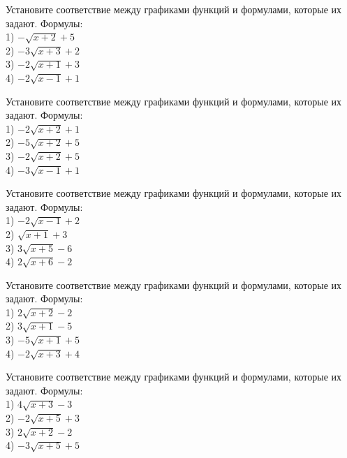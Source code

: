\documentclass[4apaper]{article}
\begin{document}
\begin{taskBN}{91}
Установите соответствие между графиками функций и формулами, которые их задают. Формулы: \\1) $-\sqrt{x+2}+5$\\2) $-3\sqrt{x+3}+2$\\3) $-2\sqrt{x+1}+3$\\4) $-2\sqrt{x-1}+1$
\end{taskBN}

\begin{taskBN}{92}
Установите соответствие между графиками функций и формулами, которые их задают. Формулы: \\1) $-2\sqrt{x+2}+1$\\2) $-5\sqrt{x+2}+5$\\3) $-2\sqrt{x+2}+5$\\4) $-3\sqrt{x-1}+1$
\end{taskBN}

\begin{taskBN}{93}
Установите соответствие между графиками функций и формулами, которые их задают. Формулы: \\1) $-2\sqrt{x-1}+2$\\2) $\sqrt{x+1}+3$\\3) $3\sqrt{x+5}-6$\\4) $2\sqrt{x+6}-2$
\end{taskBN}

\begin{taskBN}{94}
Установите соответствие между графиками функций и формулами, которые их задают. Формулы: \\1) $2\sqrt{x+2}-2$\\2) $3\sqrt{x+1}-5$\\3) $-5\sqrt{x+1}+5$\\4) $-2\sqrt{x+3}+4$
\end{taskBN}

\begin{taskBN}{95}
Установите соответствие между графиками функций и формулами, которые их задают. Формулы: \\1) $4\sqrt{x+3}-3$\\2) $-2\sqrt{x+5}+3$\\3) $2\sqrt{x+2}-2$\\4) $-3\sqrt{x+5}+5$
\end{taskBN}
\end{document}
